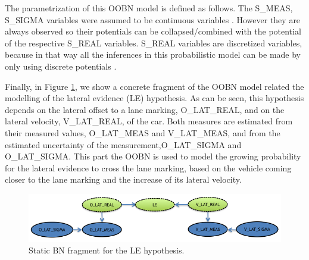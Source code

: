 The parametrization of this OOBN model is defined as follows. The S\_MEAS, S\_SIGMA variables were assumed to be continuous variables \cite{kasper2012object}. However they are always observed so their potentials can be collapsed/combined with the potential of the respective S\_REAL variables. S\_REAL variables are discretized variables, because in that way all the inferences in this probabilistic model can be made by only using discrete potentials \cite{nielsen2009bayesian}.

Finally, in Figure \ref{Figure:DaimlerLE}, we show a concrete fragment of the OOBN model related the modelling of the lateral evidence (LE) hypothesis. As can be seen, this hypothesis depends on the lateral offset to a lane marking, O\_LAT\_REAL, and on the lateral velocity, V\_LAT\_REAL, of the car. Both measures are estimated from their measured values, O\_LAT\_MEAS and V\_LAT\_MEAS, and from the estimated uncertainty of the measurement,O\_LAT\_SIGMA and O\_LAT\_SIGMA. This part the OOBN is used to model the growing probability for the lateral evidence to cross the lane marking, based on the vehicle coming closer to the lane marking and the increase of its lateral velocity.

\begin{figure}
\begin{center}
\includegraphics[scale=0.58]{./figures/DaimlerLE}
\caption{\label{Figure:DaimlerLE} Static BN fragment for the LE hypothesis.}
\end{center}
\end{figure}
